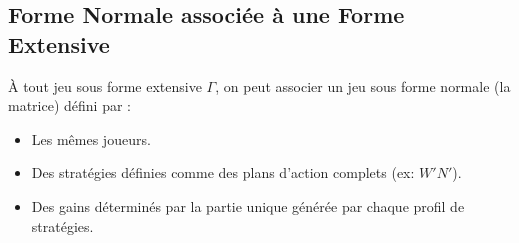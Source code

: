 \subsection{Forme Normale associée à une Forme Extensive}
\begin{definition}
À tout jeu sous forme extensive $\Gamma$, on peut associer un jeu sous forme normale (la matrice) défini par :
\begin{itemize}
    \item Les mêmes joueurs.
    \item Des stratégies définies comme des plans d'action complets (ex: $W'N'$).
    \item Des gains déterminés par la partie unique générée par chaque profil de stratégies.
\end{itemize}
\end{definition}

